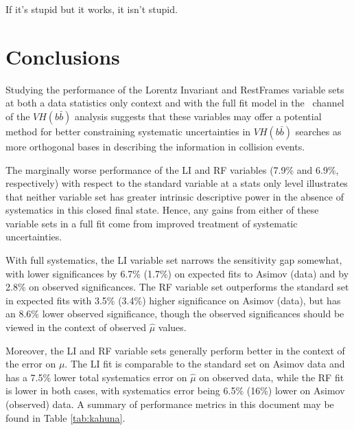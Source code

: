 \begin{savequote}[75mm]
If it's stupid but it works, it isn't stupid.
\end{savequote}

\chapter{Conclusions}

Studying the performance of the Lorentz Invariant and RestFrames variable sets at both a data statistics only context and with the full fit model in the \ZH\, channel of the $VH\left(b\bar{b}\right)$ analysis suggests that these variables may offer a potential method for better constraining systematic uncertainties in $VH\left(b\bar{b}\right)$ searches as more orthogonal bases in describing the information in collision events.  

The marginally worse performance of the LI and RF variables (7.9\% and 6.9\%, respectively) with respect to the standard variable at a stats only level illustrates that neither variable set has greater intrinsic descriptive power in the absence of systematics in this closed final state.  Hence, any gains from either of these variable sets in a full fit come from improved treatment of systematic uncertainties.

With full systematics, the LI variable set narrows the sensitivity gap somewhat, with lower significances by 6.7\% (1.7\%) on expected fits to Asimov (data) and by 2.8\% on observed significances.  The RF variable set outperforms the standard set in expected fits with 3.5\% (3.4\%) higher significance on Asimov (data), but has an 8.6\% lower observed significance, though the observed significances should be viewed in the context of observed $\hat{\mu}$ values.

Moreover, the LI and RF variable sets generally perform better in the context of the error on $\mu$.  The LI fit is comparable to the standard set on Asimov data and has a 7.5\% lower total systematics error on $\hat{\mu}$ on observed data, while the RF fit is lower in both cases, with systematics error being 6.5\% (16\%) lower on Asimov (observed) data.  A summary of performance metrics in this document may be found in Table \ref{tab:kahuna}.  


